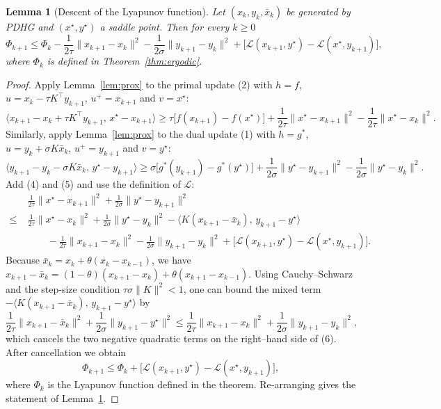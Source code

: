 \documentclass{article}
\newtheorem{lemma}{Lemma}
\begin{document}
\begin{lemma}[Descent of the Lyapunov function]\label{lem:descent}
Let $(x_k,y_k,\bar x_k)$ be generated by PDHG and $(x^{\star},y^{\star})$
a saddle point. Then for every $k\ge0$
\[
\Phi_{k+1}\le \Phi_{k}
 -\frac{1}{2\tau}\|x_{k+1}-x_{k}\|^{2}
 -\frac{1}{2\sigma}\|y_{k+1}-y_{k}\|^{2}
 +\bigl[\mathcal L(x_{k+1},y^{\star})-\mathcal L(x^{\star},y_{k+1})\bigr],
\]
where $\Phi_k$ is defined in Theorem~\ref{thm:ergodic}.
\end{lemma}
\begin{proof}
Apply Lemma~\ref{lem:prox} to the primal update (2) with $h=f$,
$u=x_k-\tau K^{\top}y_{k+1}$, $u^{+}=x_{k+1}$ and $v=x^{\star}$:
\[
\langle x_{k+1}-x_k+\tau K^{\top}y_{k+1},\,x^{\star}-x_{k+1}\rangle
\ge \tau\bigl[f(x_{k+1})-f(x^{\star})\bigr]
+\frac{1}{2\tau}\|x^{\star}-x_{k+1}\|^{2}
-\frac{1}{2\tau}\|x^{\star}-x_{k}\|^{2}. \tag{4}
\]
Similarly, apply Lemma~\ref{lem:prox} to the dual update (1) with
$h=g^{*}$, $u=y_k+\sigma K\bar x_k$, $u^{+}=y_{k+1}$ and $v=y^{\star}$:
\[
\langle y_{k+1}-y_k-\sigma K\bar x_k,\,y^{\star}-y_{k+1}\rangle
\ge \sigma\bigl[g^{*}(y_{k+1})-g^{*}(y^{\star})\bigr]
+\frac{1}{2\sigma}\|y^{\star}-y_{k+1}\|^{2}
-\frac{1}{2\sigma}\|y^{\star}-y_{k}\|^{2}. \tag{5}
\]
Add (4) and (5) and use the definition of $\mathcal L$:
\[
\begin{aligned}
&\frac{1}{2\tau}\|x^{\star}-x_{k+1}\|^{2}
+\frac{1}{2\sigma}\|y^{\star}-y_{k+1}\|^{2}  \\[2pt]
\le\;&\frac{1}{2\tau}\|x^{\star}-x_{k}\|^{2}
      +\frac{1}{2\sigma}\|y^{\star}-y_{k}\|^{2}
      -\langle K(x_{k+1}-\bar x_k),\,y_{k+1}-y^{\star}\rangle  \\[2pt]
 &\qquad -\frac{1}{2\tau}\|x_{k+1}-x_k\|^{2}
      -\frac{1}{2\sigma}\|y_{k+1}-y_k\|^{2}
      +\bigl[\mathcal L(x_{k+1},y^{\star})-\mathcal L(x^{\star},y_{k+1})\bigr].
\end{aligned}
\tag{6}
\]
Because $\bar x_k = x_k+\theta(x_k-x_{k-1})$, we have
$x_{k+1}-\bar x_k = (1-\theta)(x_{k+1}-x_k)+\theta(x_{k+1}-x_{k-1})$.
Using Cauchy–Schwarz and the step‑size condition
$\tau\sigma\|K\|^{2}<1$, one can bound the mixed term
$-\langle K(x_{k+1}-\bar x_k),\,y_{k+1}-y^{\star}\rangle$ by
\[
\frac{1}{2\tau}\|x_{k+1}-\bar x_k\|^{2}
+\frac{1}{2\sigma}\|y_{k+1}-y^{\star}\|^{2}
\le\frac{1}{2\tau}\|x_{k+1}-x_k\|^{2}
+\frac{1}{2\sigma}\|y_{k+1}-y_k\|^{2},
\]
which cancels the two negative quadratic terms on the right–hand side
of (6). After cancellation we obtain
\[
\Phi_{k+1}\le \Phi_{k}
+\bigl[\mathcal L(x_{k+1},y^{\star})-\mathcal L(x^{\star},y_{k+1})\bigr],
\]
where $\Phi_k$ is the Lyapunov function defined in the theorem.
Re‑arranging gives the statement of Lemma~\ref{lem:descent}. \qedhere
\end{proof}
\end{document}
